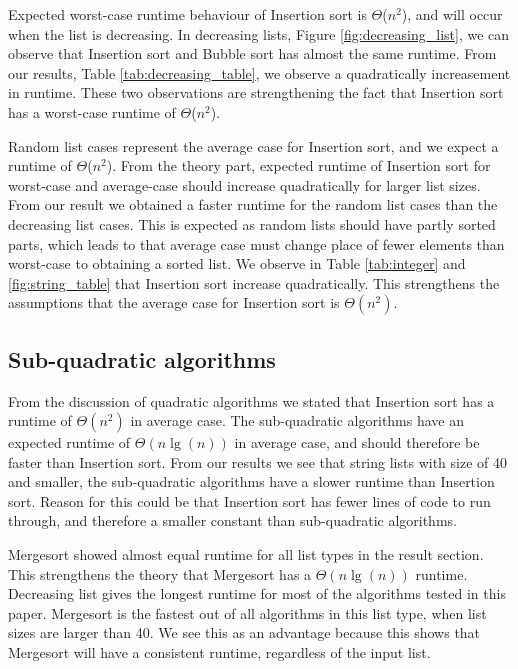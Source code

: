 \documentclass[sigconf, nonacm, natbib, screen, balance=False]{acmart}
\begin{document}
Expected worst-case runtime behaviour of Insertion sort is $\Theta$($n^2$), and will occur when the list is decreasing. In decreasing lists, Figure \ref{fig:decreasing_list}, we can observe that Insertion sort and Bubble sort has almost the same runtime. From our results, Table \ref{tab:decreasing_table}, we observe a quadratically increasement in runtime. These two observations are strengthening the fact that Insertion sort has a worst-case runtime of $\Theta$($n^2$).

Random list cases represent the average case for Insertion sort, and we expect a runtime of $\Theta$($n^2$). From the theory part, expected runtime of Insertion sort for worst-case and average-case should increase quadratically for larger list sizes. From our result we obtained a faster runtime for the random list cases than the decreasing list cases. This is expected as random lists should have partly sorted parts, which leads to that average case must change place of fewer elements than worst-case to obtaining a sorted list. We observe in Table \ref{tab:integer} and \ref{fig:string_table} that Insertion sort increase quadratically. This strengthens the assumptions that the average case for Insertion sort is $\Theta(n^2)$. 



\subsection{Sub-quadratic algorithms}

From the discussion of quadratic algorithms we stated that Insertion sort has a runtime of $\Theta(n^2)$ in average case. The sub-quadratic algorithms have an expected runtime of $\Theta(n\lg(n))$ in average case, and should therefore be faster than Insertion sort. From our results we see that string lists with size of 40 and smaller, the sub-quadratic algorithms have a slower runtime than Insertion sort. Reason for this could be that Insertion sort has fewer lines of code to run through, and therefore a smaller constant than sub-quadratic algorithms. 

Mergesort showed almost equal runtime for all list types in the result section. This strengthens the theory that Mergesort has a $\Theta(n\lg(n))$ runtime. Decreasing list gives the longest runtime for most of the algorithms tested in this paper. Mergesort is the fastest out of all algorithms in this list type, when list sizes are larger than 40. We see this as an advantage because this shows that Mergesort will have a consistent runtime, regardless of the input list. 
\end{document}
